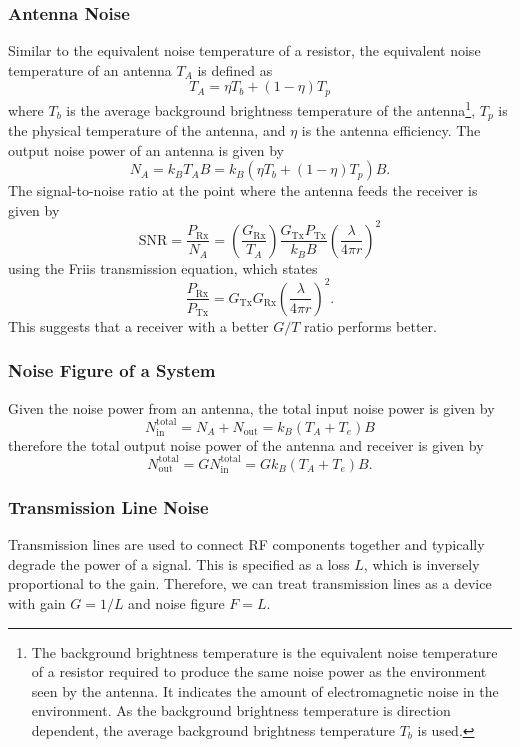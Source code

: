 \documentclass{article}
\begin{document}
\subsubsection{Antenna Noise}
Similar to the equivalent noise temperature of a resistor, the
equivalent noise temperature of an antenna \(T_A\) is defined as
\begin{equation*}
    T_A = \eta T_b + \left( 1 - \eta \right) T_p
\end{equation*}
where \(T_b\) is the average background brightness temperature of the antenna\footnote{
    The background brightness temperature is the equivalent noise
    temperature of a resistor required to produce the same noise power as
    the environment seen by the antenna. It indicates the amount of
    electromagnetic noise in the environment. As the background brightness
    temperature is direction dependent, the average background brightness
    temperature \(T_b\) is used.
}, \(T_p\) is the physical temperature of the antenna, and \(\eta\) is the
antenna efficiency.
The output noise power of an antenna is given by
\begin{equation*}
    N_A = k_B T_A B = k_B \left( \eta T_b + \left( 1 - \eta \right) T_p \right) B.
\end{equation*}
The signal-to-noise ratio at the point where the antenna feeds the
receiver is given by
\begin{equation*}
    \mathrm{SNR} = \frac{P_\mathrm{Rx}}{N_A} = \left( \frac{G_\mathrm{Rx}}{T_A} \right) \frac{G_\mathrm{Tx} P_\mathrm{Tx}}{k_B B} \left( \frac{\lambda}{4 \pi r} \right)^2
\end{equation*}
using the Friis transmission equation, which states
\begin{equation*}
    \frac{P_\mathrm{Rx}}{P_\mathrm{Tx}} = G_\mathrm{Tx} G_\mathrm{Rx} \left( \frac{\lambda}{4 \pi r} \right)^2.
\end{equation*}
This suggests that a receiver with a better \(G/T\) ratio performs better.
\subsubsection{Noise Figure of a System}
Given the noise power from an antenna, the total input noise power is
given by
\begin{equation*}
    N_\mathrm{in}^\mathrm{total} = N_A + N_\mathrm{out} = k_B \left( T_A + T_e \right) B
\end{equation*}
therefore the total output noise power of the antenna and receiver
is given by
\begin{equation*}
    N_\mathrm{out}^\mathrm{total} = G N_\mathrm{in}^\mathrm{total} = G k_B \left( T_A + T_e \right) B.
\end{equation*}
\subsubsection{Transmission Line Noise}
Transmission lines are used to connect RF components together and
typically degrade the power of a signal. This is specified as a loss \(L\),
which is inversely proportional to the gain. Therefore, we can treat
transmission lines as a device with gain \(G = 1/L\) and noise figure
\(F = L\).
\end{document}
